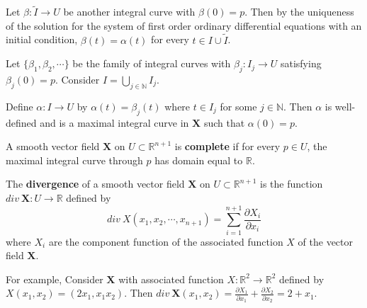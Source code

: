 	Let $\beta : \tilde{I} \to U$ be another integral curve with $\beta(0) = p$. Then by the uniqueness of the solution for the system of first order ordinary differential equations with an initial condition, $\beta(t) = \alpha(t)$ for every $ t \in I \cup \tilde{I}$.

	Let $\{\beta_1,\beta_2,\cdots\}$ be the family of integral curves with $\beta_j : I_j \to U$ satisfying $\beta_j(0) = p$. Consider $I = \bigcup\limits_{j \in \mathbb{N}} I_j$.

	Define $\alpha : I \to U$ by $\alpha(t) = \beta_j(t)$ where $t \in I_j$ for some $j \in \mathbb{N}$. Then $\alpha$ is well-defined and is a maximal integral curve in $\mathbf{X}$ such that $\alpha(0) = p$.

\begin{definition}
	A smooth vector field $\mathbf{X}$ on $U \subset \mathbb{R}^{n+1}$ is \textbf{complete} if for every $p \in U$, the maximal integral curve through $p$ has domain equal to $\mathbb{R}$.
\end{definition}

\begin{definition}
	The \textbf{divergence} of a smooth vector field $\mathbf{X}$ on $U \subset \mathbb{R}^{n+1}$ is the function $div\ \mathbf{X} : U \to \mathbb{R}$ defined by
	\[ div\ X(x_1,x_2,\cdots,x_{n+1}) = \sum_{i=1}^{n+1} \frac{\partial X_i}{\partial x_i} \]
	where $X_i$ are the component function of the associated function $X$ of the vector field $\mathbf{X}$.
\end{definition}

For example, Consider $\mathbf{X}$ with associated function $X : \mathbb{R}^2 \to \mathbb{R}^2$ defined by $X(x_1,x_2) = (2x_1,x_1x_2)$. Then $div\ \mathbf{X}(x_1,x_2) = \frac{\partial X_1}{\partial x_1} + \frac{\partial X_2}{\partial x_2} = 2 + x_1$.

\pagebreak

